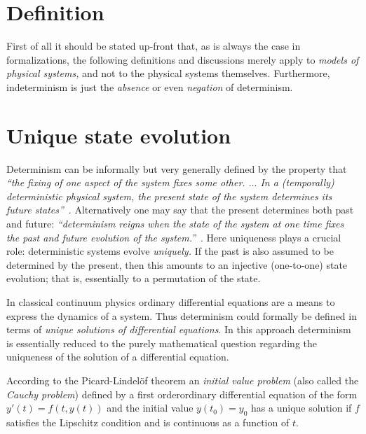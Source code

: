 \section{Definition}

First of all it should be stated up-front that,
as is always the case in formalizations,
the following definitions and discussions merely apply to
{\em models of physical systems,} and not to the physical systems themselves.
Furthermore, indeterminism is just the {\em absence} or even {\em negation} of determinism.

\section{Unique state evolution}


Determinism
can be informally but very generally defined by the property that  {\em ``the fixing of one aspect of the system fixes some other.
$\ldots$ In a (temporally) deterministic physical system,
the present state of the system determines its future states''}~\cite[Chapter on Indeterministic Physical Systems]{Norton-induction}.
Alternatively one may say that the present determines both past and future: {\em ``determinism reigns when the state of the system at one time fixes the past and future
evolution of the system.''}~\cite{Werndl-DeterminismandIndeterminism}.
Here uniqueness plays a crucial role: deterministic systems evolve {\em uniquely.}
If the past is also assumed to be determined by the present, then this amounts to an injective (one-to-one) state evolution;
that is, essentially to a permutation of the state.

In classical continuum physics ordinary differential equations are a means to express the dynamics of a system.
Thus determinism could formally be defined in terms of {\em unique solutions of differential equations}.
In this approach determinism is essentially reduced to the
purely mathematical question regarding the uniqueness of the solution of a  differential equation.


According to the Picard-Lindel\"of theorem %
an {\em initial value problem}
(also called the {\em Cauchy problem})
defined by a first orderordinary differential equation of the form $y'(t)=f(t,y(t))$
and the initial value $y(t_0)=y_0$
has a unique solution if $f$  satisfies the
Lipschitz condition and is continuous as a function of $t$.

